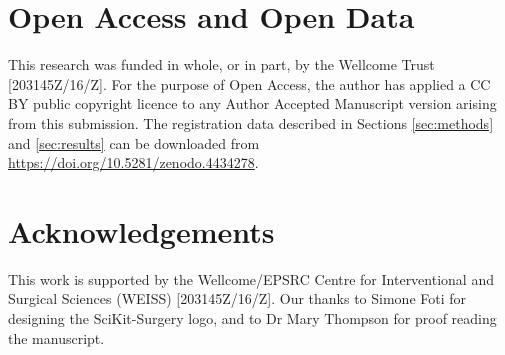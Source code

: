 \section{Open Access and Open Data}
This research was funded in whole, or in part, by the Wellcome Trust [203145Z/16/Z]. 
For the purpose of Open Access, the author has applied a CC BY public copyright licence to any Author Accepted Manuscript version arising from this submission.
The registration data described in Sections \ref{sec:methods} and \ref{sec:results} can be downloaded from \href{https://doi.org/10.5281/zenodo.4434278}{https://doi.org/10.5281/zenodo.4434278}.


\section{Acknowledgements}
This work is supported by the Wellcome/EPSRC Centre for Interventional and Surgical Sciences (WEISS) [203145Z/16/Z]. Our thanks to Simone Foti for designing the SciKit-Surgery logo, and to Dr Mary Thompson for proof reading the manuscript.


